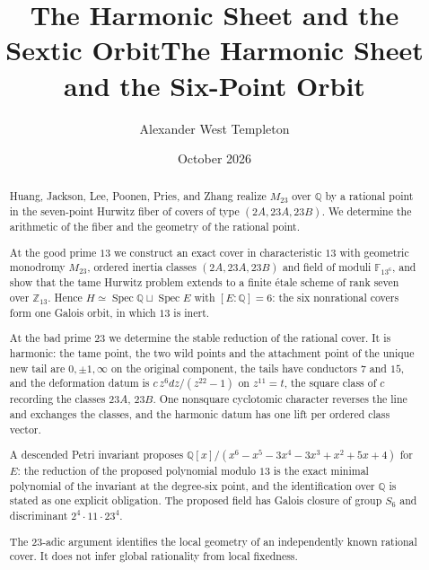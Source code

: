 \documentclass[11pt]{amsart}
\title{The Harmonic Sheet and the Sextic Orbit}
\title{The Harmonic Sheet and the Six-Point Orbit}
\author{Alexander West Templeton}
\date{October 2026}
\newif\ifrelqclosed
\newcommand{\QQ}{\mathbb{Q}}
\newcommand{\ZZ}{\mathbb{Z}}
\newcommand{\FF}{\mathbb{F}}
\newcommand{\Mtw}{M_{23}}
\newcommand{\sqm}{\sqrt{-23}}
\newcommand{\Spec}{\operatorname{Spec}}
\newcommand{\sextic}{x^6-x^5-3x^4-3x^3+x^2+5x+4}
\theoremstyle{plain}
\theoremstyle{definition}
\begin{document}
\begin{abstract}
Huang, Jackson, Lee, Poonen, Pries, and Zhang realize $\Mtw$ over $\QQ$
by a rational point in the seven-point Hurwitz fiber of covers of type
$(2A,23A,23B)$. We determine the arithmetic of the fiber and the
geometry of the rational point.

At the good prime $13$ we construct an exact cover in characteristic
$13$ with geometric monodromy $\Mtw$, ordered inertia classes
$(2A,23A,23B)$ and field of moduli $\FF_{13^6}$, and show that the tame
Hurwitz problem extends to a finite \'etale scheme of rank seven over
$\ZZ_{13}$. Hence $H\simeq\Spec\QQ\sqcup\Spec E$ with $[E:\QQ]=6$: the
six nonrational covers form one Galois orbit, in which $13$ is inert.

At the bad prime $23$ we determine the stable reduction of the rational
cover. It is harmonic: the tame point, the two wild points and the
attachment point of the unique new tail are $0,\pm1,\infty$ on the
original component, the tails have conductors $7$ and $15$, and the
deformation datum is $c\,z^6dz/(z^{22}-1)$ on $z^{11}=t$, the square
class of $c$ recording the classes $23A$, $23B$. One nonsquare
cyclotomic character reverses the line and exchanges the classes, and
the harmonic datum has one lift per ordered class vector.

\ifrelqclosed
A descended Petri invariant names the orbit. An exact canonical model
of one of the six covers over $F(\sqm)$, $F=\QQ[x]/(\sextic)$,
reconstructed from the $13$-adic lift of the characteristic-$13$ point
and then verified over that field --- including an exact certificate
that its degree-$23$ map has exactly three branch points --- gives a
point of the Hurwitz scheme at which the invariant has minimal
polynomial the recognized sextic.
Hence $E\simeq F$, whose Galois closure has group $S_6$ and
discriminant $2^4\cdot11\cdot23^4$.
\else
A descended Petri invariant proposes $\QQ[x]/(\sextic)$ for $E$: the
reduction of the proposed polynomial modulo $13$ is the exact minimal
polynomial of the invariant at the degree-six point, and the
identification over $\QQ$ is stated as one explicit obligation. The
proposed field has Galois closure of group $S_6$ and discriminant
$2^4\cdot11\cdot23^4$.
\fi

The $23$-adic argument identifies the local geometry of an
independently known rational cover. It does not infer global
rationality from local fixedness.
\end{abstract}

\maketitle
\end{document}
